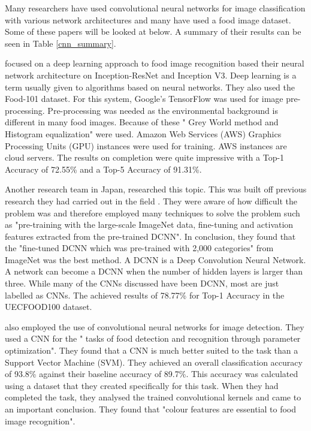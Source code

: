 Many researchers have used convolutional neural networks for image
classification with various network architectures and many have used a food image dataset.
Some of these papers will be looked at below.
A summary of their results can be seen in Table \ref{cnn_summary}.

\parencite{deepLearning} focused on a deep learning approach to food image recognition based
their neural network architecture on Inception-ResNet and Inception V3.
Deep learning is a term usually given to algorithms based on neural networks.
They also used the Food-101 dataset. For this system, Google's
TensorFlow was used for image pre-processing. Pre-processing was needed as the
environmental background is different in many food images. Because of these
" Grey World method and Histogram equalization" \parencite{deepLearning} were
used.
Amazon Web Services (AWS) Graphics Processing Units (GPU) instances were used for training.
AWS instances are cloud servers.
The results on completion were quite impressive with a Top-1 Accuracy of 72.55\% and a Top-5 Accuracy of 91.31\%.

Another research team in Japan, \parencite{yanaiFood} researched this topic. This was built off previous research they had carried out in the field \parencite{kawano2014food}.
They were aware of how
difficult the problem was and therefore employed many techniques to solve the
problem such as "pre-training with the large-scale ImageNet data, fine-tuning
and activation features extracted from the pre-trained DCNN". 
In conclusion, they found that the "fine-tuned DCNN which was pre-trained
with 2,000 categories" from ImageNet was the best method. A
DCNN is a Deep Convolution Neural Network. 
A network can become a DCNN when the number of hidden layers is larger than three.
While many of the CNNs discussed have been DCNN, most are just labelled as CNNs.
The achieved results of 78.77\% for Top-1 Accuracy in the UECFOOD100 dataset.

\parencite{kagayaFood} also employed the use of convolutional neural networks for
image detection. They used a CNN for the " tasks of food detection and recognition
through parameter optimization".
They found that a CNN is much better suited to the task than a Support Vector
Machine (SVM). They achieved an overall classification accuracy of 93.8\%
against their baseline accuracy of 89.7\%. This accuracy
was calculated using a dataset that they created specifically for this task.
When they had completed the task, they analysed the trained convolutional kernels
and came to an important conclusion. They found that "colour features are
essential to food image recognition".

